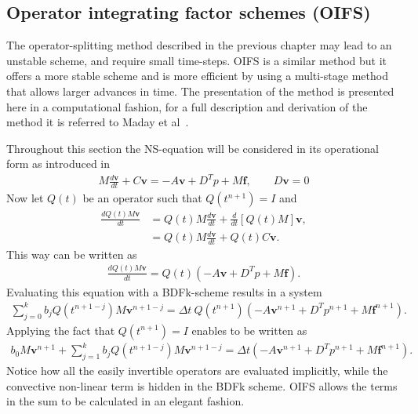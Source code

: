 \subsection{Operator integrating factor schemes (OIFS)}\label{OIFS}
The operator-splitting method described in the previous chapter may lead to an unstable scheme, 
and require small time-steps.
OIFS is a similar method but it offers a more stable scheme and is more efficient by using a multi-stage method that allows 
larger advances in time. The presentation of the method is presented here in a computational fashion,
for a full description and derivation of the method it is referred to Maday et al~\cite{raey}.

Throughout this section the NS-equation will be considered in its operational form as introduced in~
%
\begin{align}
    M\frac{d \mathbf{v}}{dt} + C\mathbf{v} = -A\mathbf{v} +D^T p +M\mathbf{f}, \qquad D\mathbf{v} = 0
    \label{eq:NSoperator}
\end{align}
%
Now let $Q(t)$ be an operator such that $Q(t^{n+1}) = I$ and 
%
\begin{align}
    \frac{dQ(t)M\mathbf{v}}{dt} &=  Q(t)M\frac{d\mathbf{v}}{dt} + \frac{d}{dt}\left[  Q(t)M\right]\mathbf{v},\\
    &= Q(t)M\frac{d\mathbf{v}}{dt} + Q(t)C\mathbf{v}. 
    \label{eq:integrationalfactor}
\end{align}
%
This way  can be written as 
\begin{align}
    \frac{d Q(t)M\mathbf{v}}{dt} =Q(t)( -A\mathbf{v} +D^T p +M\mathbf{f}).
    \label{eq:NSoperatorOIFS}
\end{align}
Evaluating this equation with a BDFk-scheme results in a system 
\begin{align}
    \sum_{j=0}^{k}b_jQ(t^{n+1-j})M\mathbf{v}^{n+1-j} =\Delta t \: Q(t^{n+1})( -A\mathbf{v}^{n+1} +D^T p^{n+1} +M\mathbf{f}^{n+1}).
    \label{eq:NSOIFS1}
\end{align}
Applying the fact that $Q(t^{n+1}) = I$ enables  to be written as 
\begin{align}
    b_0M\mathbf{v}^{n+1} + \sum_{j=1}^{k}b_jQ(t^{n+1-j})M\mathbf{v}^{n+1-j} 
    =\Delta t ( -A\mathbf{v}^{n+1} +D^T p^{n+1} +M\mathbf{f}^{n+1}).
    \label{eq:NSOIFS1}
\end{align}
Notice how all the easily invertible operators are evaluated implicitly, while the convective non-linear term is hidden in the BDFk scheme. 
OIFS allows the terms in the sum to be calculated in an elegant fashion.

